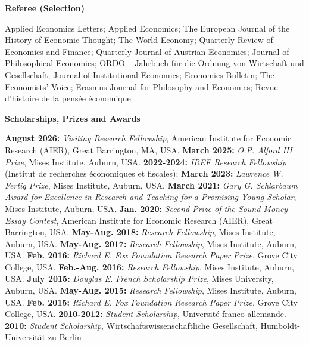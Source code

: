 \documentclass[11pt]{article}
\begin{document}
\vspace{20pt}

\begin{center}
    \textbf{Referee (Selection)} \\
\end{center}

Applied Economics Letters; Applied Economics; The European Journal of the History of Economic Thought; The World Economy; Quarterly Review of Economics and Finance; Quarterly Journal of Austrian Economics; Journal of Philosophical Economics; ORDO – Jahrbuch für die Ordnung von Wirtschaft und Gesellschaft; Journal of Institutional Economics; Economics Bulletin; The Economists’ Voice; Erasmus Journal for Philosophy and Economics; Revue d'histoire de la pensée économique

\vspace{20pt}

\begin{center}
    \textbf{Scholarships, Prizes and Awards} \\
\end{center} 

\textbf{August 2026:} \textit{Visiting Research Fellowship}, American Institute for Economic Research (AIER), Great Barrington, MA, USA. \textbf{March 2025:} \textit{O.P. Alford III Prize}, Mises Institute, Auburn, USA. 
\textbf{2022-2024:} \textit{IREF Research Fellowship} (Institut de recherches économiques et fiscales);
\textbf{March 2023:} \textit{Lawrence W. Fertig Prize}, Mises Institute, Auburn, USA. 
\textbf{March 2021:} \textit{Gary G. Schlarbaum Award for Excellence in Research and Teaching for a Promising Young Scholar}, Mises Institute, Auburn, USA.
\textbf{Jan. 2020:} \textit{Second Prize of the Sound Money Essay Contest}, American Institute for Economic Research (AIER), Great Barrington, USA.
\textbf{May-Aug. 2018:} \textit{Research Fellowship}, Mises Institute, Auburn, USA. 
\textbf{May-Aug. 2017:} \textit{Research Fellowship}, Mises Institute, Auburn, USA. 
\textbf{Feb. 2016:} \textit{Richard E. Fox Foundation Research Paper Prize}, Grove City College, USA.
\textbf{Feb.-Aug. 2016:} \textit{Research Fellowship}, Mises Institute, Auburn, USA.
\textbf{July 2015:} \textit{Douglas E. French Scholarship Prize}, Mises University, Auburn, USA.
\textbf{May-Aug. 2015:} \textit{Research Fellowship}, Mises Institute, Auburn, USA.
\textbf{Feb. 2015:} \textit{Richard E. Fox Foundation Research Paper Prize}, Grove City College, USA.
\textbf{2010-2012:} \textit{Student Scholarship}, Université franco-allemande.
\textbf{2010:} \textit{Student Scholarship}, Wirtschaftswissenschaftliche Gesellschaft, Humboldt-Universität zu Berlin
\end{document}
